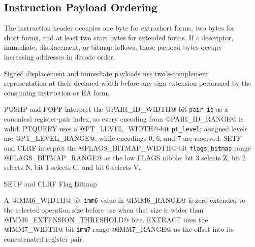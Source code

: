 \subsection{Instruction Payload Ordering}
The instruction header occupies one byte for extrashort forms, two bytes for short forms, and at least two start
bytes for extended forms. If a descriptor, immediate, displacement, or bitmap follows, those payload bytes
occupy increasing addresses in decode order.

Signed displacement and immediate payloads use two's-complement representation at their declared width before any
sign extension performed by the consuming instruction or EA form.



PUSHP and POPP interpret the @PAIR_ID_WIDTH@-bit \texttt{pair\_id} as a canonical register-pair index, so every encoding
from @PAIR_ID_RANGE@ is valid.
PTQUERY uses a @PT_LEVEL_WIDTH@-bit \texttt{pt\_level}; assigned levels are @PT_LEVEL_RANGE@, while encodings 0, 6, and 7
are reserved.
SETF and CLRF interpret the @FLAGS_BITMAP_WIDTH@-bit \texttt{flags\_bitmap} range @FLAGS_BITMAP_RANGE@ as the low FLAGS
nibble: bit 3 selects Z, bit 2 selects N, bit 1 selects C,
and bit 0 selects V.

\begin{manuallistedformatdiagram}{SETF and CLRF Flag Bitmap}
\end{manuallistedformatdiagram}

A @IMM6_WIDTH@-bit \texttt{imm6} value in @IMM6_RANGE@ is zero-extended to the selected operation size before use when
that size is wider than @IMM6_EXTENSION_THRESHOLD@ bits. EXTRACT uses the @IMM7_WIDTH@-bit \texttt{imm7} range @IMM7_RANGE@ as the
offset into its concatenated register pair.
